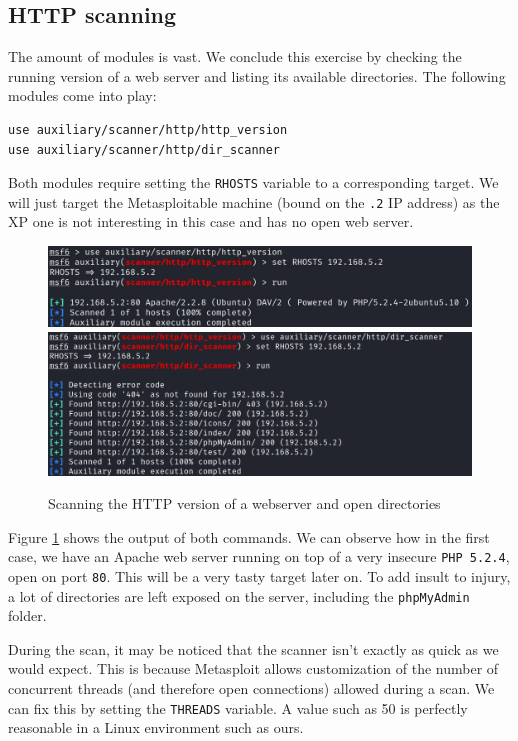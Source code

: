 \subsection{HTTP scanning}
The amount of modules is vast. We conclude this exercise by checking the running version of a web server and listing its available directories. The following modules come into play:

\begin{lstlisting}
use auxiliary/scanner/http/http_version
use auxiliary/scanner/http/dir_scanner
\end{lstlisting}

Both modules require setting the \texttt{RHOSTS} variable to a corresponding target. We will just target the Metasploitable machine (bound on the \texttt{.2} IP address) as the XP one is not interesting in this case and has no open web server. 

\begin{figure}[htbp]
	\centering
	\includegraphics[width=\textwidth]{../drawable/exercise_1_screenshots/es1-http.jpg}
	\includegraphics[width=\textwidth]{../drawable/exercise_1_screenshots/es1-httpdir.jpg}
	\caption{Scanning the HTTP version of a webserver and open directories}
	\label{fig:ex1:http}
\end{figure}

Figure \ref{fig:ex1:http} shows the output of both commands. We can observe how in the first case, we have an Apache web server running on top of a very insecure \texttt{PHP 5.2.4}, open on port \texttt{80}. This will be a very tasty target later on. To add insult to injury, a lot of directories are left exposed on the server, including the \texttt{phpMyAdmin} folder.

During the scan, it may be noticed that the scanner isn't exactly as quick as we would expect. This is because Metasploit allows customization of the number of concurrent threads (and therefore open connections) allowed during a scan. We can fix this by setting the \texttt{THREADS} variable. A value such as 50 is perfectly reasonable in a Linux environment such as ours. 

